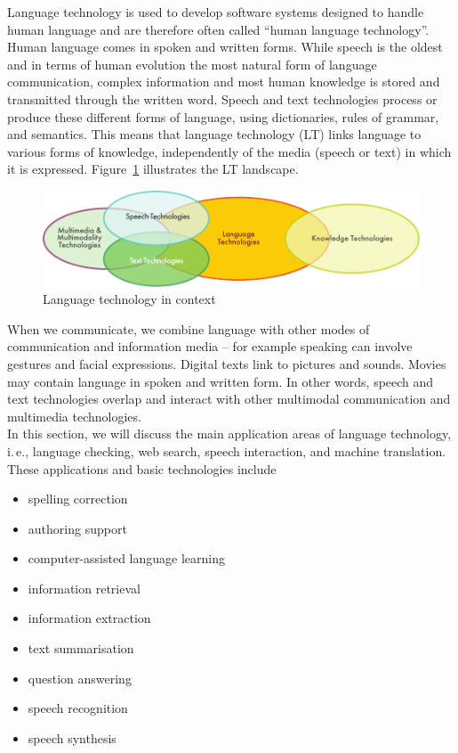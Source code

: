 \documentclass[]{../../metanetpaper}
\begin{document}
\begin{multicols}{2}

Language technology is used to develop software systems designed to handle human language and are therefore often called “human language technology”. Human language comes in spoken and written forms. While speech is the oldest and in terms of human evolution the most natural form of language communication, complex information and most human knowledge is stored and transmitted through the written word. Speech and text technologies process or produce these different forms of language, using dictionaries, rules of grammar, and semantics. This means that language technology (LT) links language to various forms of knowledge, independently of the media (speech or text) in which it is expressed. Figure~\ref{fig:ltincontext_en} illustrates the LT landscape.

\begin{figure}[htb]
  \center
  \includegraphics[width=\textwidth]{../_media/english/language_technologies}
  \caption{Language technology in context}
  \label{fig:ltincontext_en}
\end{figure}

When we communicate, we combine language with other modes of communication and information media – for example speaking can involve gestures and facial expressions. Digital texts link to pictures and sounds. Movies may contain language in spoken and written form. In other words, speech and text technologies overlap and interact with other multimodal communication and multimedia technologies.\\ 
In this section, we will discuss the main application areas of language technology, i.\,e., language checking, web search, speech interaction, and machine translation. These applications and basic technologies include 

\begin{itemize}
\item spelling correction
\item authoring support
\item computer-assisted language learning
\item information retrieval 
\item information extraction
\item text summarisation
\item question answering
\item speech recognition 
\item speech synthesis 
\end{itemize}


\end{multicols}
\end{document}
